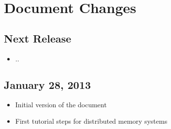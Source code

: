 \section*{Document Changes}

\subsection*{Next Release} %
\begin{itemize}
  \item ..
\end{itemize}

\subsection*{January 28, 2013}
\begin{itemize}
\item Initial version of the document
\item First tutorial steps for distributed memory systems
\end{itemize}